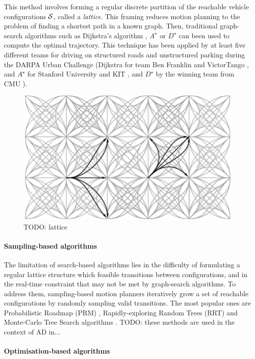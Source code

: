 This method involves forming a regular discrete partition of the reachable vehicle configurations $\mathcal{S}$, called a \emph{lattice}. This framing reduces motion planning to the problem of finding a shortest path in a known graph. Then, traditional graph-search algorithms such as Dijkstra's algorithm \citep{Dijkstra1959}, $A^\star$ \citep{Hart1968} or $D^\star$ \citep{Stentz1994} can been used to compute the optimal trajectory. This technique has been applied by at least five different teams for driving on structured roads and unstructured parking during the DARPA Urban Challenge (Dijkstra for team Ben Franklin \citep{Bohren2008} and VictorTango \citep{Bacha2008}, and $A^\star$ for Stanford University \citep{Montemerlo2008} and KIT \citep{Kammel2008}, and $D^\star$ by the winning team from CMU \citep{Urmson2008}).

\begin{figure}[tp]
	\centering
	\includegraphics[width=0.5\linewidth]{img/lattice2}
	\caption{TODO: lattice}
\end{figure}

\paragraph{Sampling-based algorithms}

The limitation of search-based algorithms lies in the difficulty of formulating a regular lattice structure which feasible transitions between configurations, and in the real-time constraint that may not be met by graph-search algorithms. To address them, sampling-based motion planners iteratively grow a set of reachable configurations by randomly sampling valid transitions. The most popular ones are Probabilistic Roadmap (PRM) \citep{Kavraki1996}, Rapidly-exploring Random Trees (RRT) \citep{Lavalle98,Karaman2011} and Monte-Carlo Tree Search algorithms \citep[e.g.][]{Kocsis2006}.
TODO: these methods are used in the context of AD in...

\paragraph{Optimisation-based algorithms}

